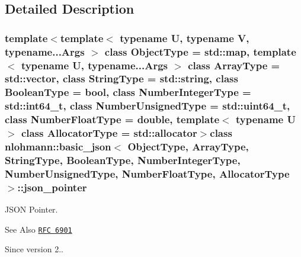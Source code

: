 \subsection{Detailed Description}
\subsubsection*{template$<$template$<$ typename U, typename V, typename...\-Args $>$ class Object\-Type = std\-::map, template$<$ typename U, typename...\-Args $>$ class Array\-Type = std\-::vector, class String\-Type = std\-::string, class Boolean\-Type = bool, class Number\-Integer\-Type = std\-::int64\-\_\-t, class Number\-Unsigned\-Type = std\-::uint64\-\_\-t, class Number\-Float\-Type = double, template$<$ typename U $>$ class Allocator\-Type = std\-::allocator$>$class nlohmann\-::basic\-\_\-json$<$ Object\-Type, Array\-Type, String\-Type, Boolean\-Type, Number\-Integer\-Type, Number\-Unsigned\-Type, Number\-Float\-Type, Allocator\-Type $>$\-::json\-\_\-pointer}

J\-S\-O\-N Pointer. 

\begin{DoxySeeAlso}{See Also}
\href{https://tools.ietf.org/html/rfc6901}{\tt R\-F\-C 6901}
\end{DoxySeeAlso}
\begin{DoxySince}{Since}
version 2.. 
\end{DoxySince}


